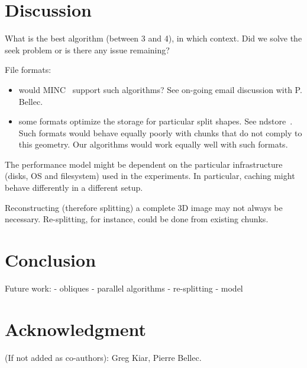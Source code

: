 \documentclass[10pt, conference, compsocconf]{IEEEtran}
\begin{document}
\section{Discussion}
\label{sec:discussion}

What is the best algorithm (between 3 and 4), in which context. Did we
solve the seek problem or is there any issue remaining?

File formats:
\begin{itemize}
\item would MINC~\cite{vincent2016minc} support such algorithms? See on-going email discussion
with P. Bellec.
\item some formats optimize the storage for particular split shapes. See
  ndstore~\cite{burns2013open}. Such formats would behave equally
  poorly with chunks that do not comply to this geometry. Our
  algorithms would work equally well with such formats.
\end{itemize}

The performance model might be dependent on the particular
infrastructure (disks, OS and filesystem) used in the experiments. In
particular, caching might behave differently in a different setup.

Reconstructing (therefore splitting) a complete 3D image may not
always be necessary. Re-splitting, for instance, could be done from
existing chunks.

\section{Conclusion}

Future work:
- obliques
- parallel algorithms
- re-splitting
- model

\section*{Acknowledgment}

(If not added as co-authors): Greg Kiar, Pierre Bellec.



\end{document}
